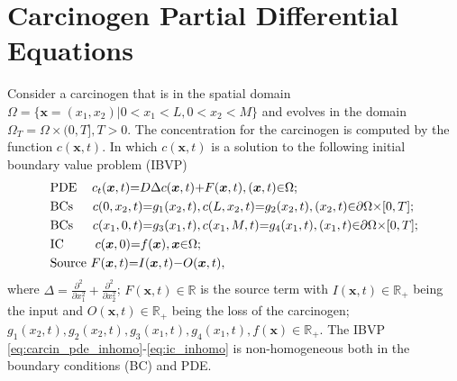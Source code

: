 \documentclass[\main/thesis.tex]{subfiles}
\begin{document}
	
\section{Carcinogen Partial Differential Equations}

Consider a carcinogen that is in the spatial domain \newline
$\Omega {=} \{ \boldsymbol{x}{=}(x_1, x_2) | 0 {<} x_1 {<} L, 0 {<} x_2 {<} M \}$ and evolves in the domain \newline $\Omega_T {=} \Omega {\times} (0, T], T {>} 0$.
The concentration for the carcinogen is computed by the function
$c(\boldsymbol{x}, t)$. In which $c(\boldsymbol{x}, t)$ is a solution to the 
following initial boundary value problem (IBVP)
\begin{align}
	&\text{PDE }    \hspace{0.12in} c_t(\boldsymbol{x}, t) {=} D \Delta c(\boldsymbol{x}, t)
	                                             {+} F(\boldsymbol{x}, t),
	                                (\boldsymbol{x}, t) {\in} \Omega;
	                                \label{eq:carcin_pde_inhomo} \\
	&\text{BCs }    \hspace{0.17in} c(0, x_2, t)   {=} g_1(x_2, t),
	                                c(L, x_2, t)   {=} g_2(x_2, t),
	                                (x_2, t) {\in} \partial \Omega{\times}[0, T];
	                                \label{eq:bcs_inhomo_x} \\
	&\text{BCs }    \hspace{0.17in} c(x_1, 0, t)   {=} g_3(x_1, t),
	                                c(x_1, M, t)   {=} g_4(x_1, t),
	                                (x_1, t) {\in} \partial \Omega{\times}[0, T];
	                                \label{eq:bcs_inhomo_y} \\
	&\text{IC }     \hspace{0.30in} c(\boldsymbol{x}, 0)   {=} f(\boldsymbol{x}),
	                                \boldsymbol{x} {\in} \Omega;
	                                \label{eq:ic_inhomo} \\
	&\text{Source }                 F(\boldsymbol{x}, t)   {=} I(\boldsymbol{x}, t)
	                                                 {-} O(\boldsymbol{x}, t),
	                                \label{eq:source_term}
\end{align}
where
$
\Delta {=} \frac{\partial^2}
                {\partial x_1^2}
       {+} \frac{\partial^2}
                {\partial x_2^2}
$;
$F(\boldsymbol{x}, t) {\in} \mathbb{R}$ is the source term with
$I(\boldsymbol{x}, t) {\in} \mathbb{R}_+$ being the input and
$O(\boldsymbol{x}, t) {\in} \mathbb{R}_+$ being the loss of the carcinogen; \newline
$
g_1(x_2, t), g_2(x_2, t), g_3(x_1, t), g_4(x_1, t), f(\boldsymbol{x}) {\in} \mathbb{R}_+
$. 
The IBVP \eqref{eq:carcin_pde_inhomo}-\eqref{eq:ic_inhomo} is non-homogeneous 
both in the boundary conditions (BC) and PDE.
\end{document}
